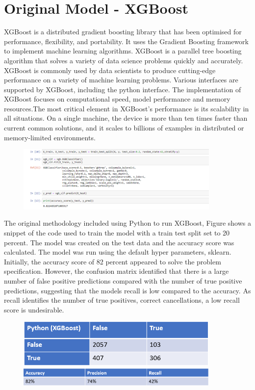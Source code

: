  \section{Original Model - XGBoost}

XGBoost is a distributed gradient boosting library that has been optimised for performance, flexibility, and portability. It uses the Gradient Boosting framework to implement machine learning algorithms. XGBoost is a parallel tree boosting algorithm that solves a variety of data science problems quickly and accurately. XGBoost is commonly used by data scientists to produce cutting-edge performance on a variety of machine learning problems. Various interfaces are supported by XGBoost, including the python interface. The implementation of XGBoost focuses on computational speed, model performance and memory resources.The most critical element in XGBoost's performance is its scalability in all situations. On a single machine, the device is more than ten times faster than current common solutions, and it scales to billions of examples in distributed or memory-limited environments\cite{ChenXGBoost:System}.

 \begin{figure}[H]
\includegraphics[width=10cm]{figures/xg_boost_code.png}
 \caption{}
\end{figure}

The original methodology included using Python to run XGBoost, Figure shows a snippet of the code used to train the model with a train test split set to 20 percent. The model was created on the test data and the accuracy score was calculated. The model was run using the default hyper parameters, sklearn. Initially, the accuracy score of 82 percent appeared to solve the problem specification. However, the confusion matrix identified that there is a large number of false positive predictions compared with the number of true positive predictions, suggesting that the models recall is low compared to the accuracy. As recall identifies the number of true positives, correct cancellations, a low recall score is undesirable.

 \begin{figure}[H]
\includegraphics[width=10cm]{figures/python_xgboost.png}
\includegraphics[width=10cm]{figures/python_recall}
 \caption{}
\end{figure}

